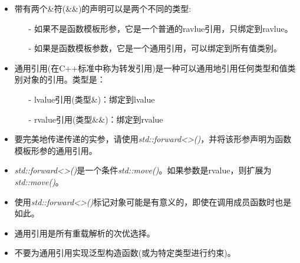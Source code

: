 \begin{itemize}
	\item 带有两个\&符(\&\&)的声明可以是两个不同的类型:
	\begin{itemize}
		\item[-] 如果不是函数模板形参，它是一个普通的ravlue引用，只绑定到ravlue。
		\item[-] 如果是函数模板参数，它是一个通用引用，可以绑定到所有值类别。
	\end{itemize}
	\item 通用引用(在C++标准中称为转发引用)是一种可以通用地引用任何类型和值类别对象的引用。类型是：
		\begin{itemize}
		\item[-] lvalue引用(类型\&)：绑定到lvalue
		\item[-] rvalue引用(类型\&\&)：绑定到rvalue
	\end{itemize}
	\item 要完美地传递传递的实参，请使用\textit{std::forward<>()}，并将该形参声明为函数模板形参的通用引用。
	\item \textit{std::forward<>()}是一个条件\textit{std::move()}。如果参数是rvalue，则扩展为\textit{std::move()}。
	\item 使用\textit{std::forward<>()}标记对象可能是有意义的，即使在调用成员函数时也是如此。
	\item 通用引用是所有重载解析的次优选择。
	\item 不要为通用引用实现泛型构造函数(或为特定类型进行约束)。
\end{itemize}


